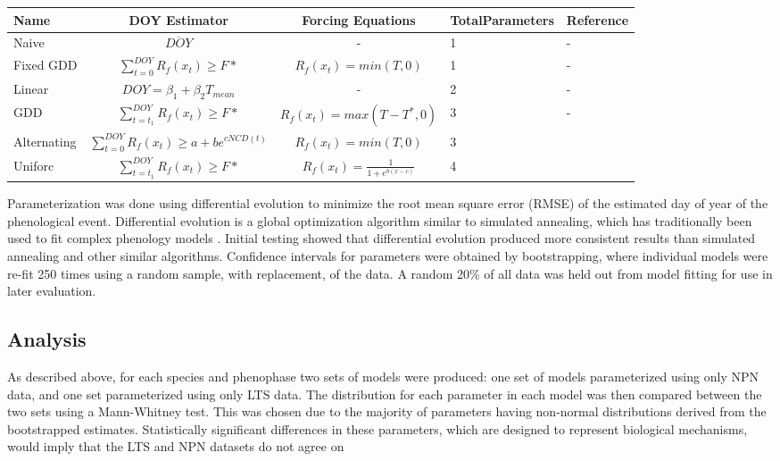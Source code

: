 \documentclass[fleqn,10pt,lineno]{wlpeerj} %
\begin{document}
\begin{center}
{\def\arraystretch{2}\tabcolsep=5pt
    \begin{tabular}{ | l | c | c | p{1.3cm} | l |}
    \hline
    Name & DOY Estimator & Forcing Equations & Total\newline Parameters & Reference \\ \hline
    Naive & \( \overline{DOY} \) & - & 1 & - \\
    Fixed GDD &$\sum_{t=0}^{DOY}R_{f}(x_{t})\geq F* $  & $R_{f}(x_{t}) = min(T, 0)$ & 1 & - \\
    Linear & \( DOY = \beta_{1} + \beta_{2}T_{mean} \) & - & 2 & - \\
    GDD & $\sum_{t=t_{1}}^{DOY}R_{f}(x_{t})\geq F* $ & $ R_{f}(x_{t}) = max(T - T^{*}, 0) $  & 3 & - \\
    Alternating & $\sum_{t=0}^{DOY}R_{f}(x_{t})\geq a + be^{cNCD(t)} $ & $R_{f}(x_{t}) = min(T, 0) $ & 3 & \citep{cannell1983} \\
    Uniforc &  $\sum_{t=t_{1}}^{DOY}R_{f}(x_{t})\geq F* $ & $ R_{f}(x_{t}) = \frac{1}{1 + e^{b(x-c)}} $ & 4 & \citep{chuine2000} \\

    \hline
    \end{tabular}
    }
\end{center}

Parameterization was done using differential evolution to minimize the root mean square error (RMSE) of the estimated day of year of the phenological event. Differential evolution is a global optimization algorithm similar to simulated annealing, which has traditionally been used to fit complex phenology models \citep{storn1997, chuine2000}. Initial testing showed that differential evolution produced more consistent results than simulated annealing and other similar algorithms. Confidence intervals for parameters were obtained by bootstrapping, where individual models were re-fit 250 times using a random sample, with replacement, of the data. A random 20\% of all data was held out from model fitting for use in later evaluation. 

\subsection*{Analysis}

As described above, for each species and phenophase two sets of models were produced: one set of models parameterized using only NPN data, and one set parameterized using only LTS data. The distribution for each parameter in each model was then compared between the two sets using a Mann-Whitney test. This was chosen due to the majority of parameters having non-normal distributions derived from the bootstrapped estimates. Statistically significant differences in these parameters, which are designed to represent biological mechanisms, would imply that the LTS and NPN datasets do not agree on
\end{document}
